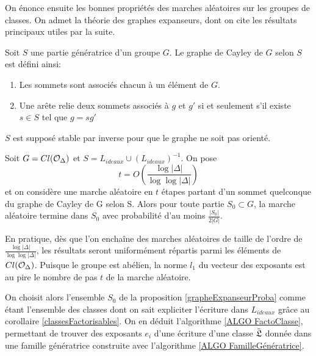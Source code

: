 On énonce ensuite les bonnes propriétés des marches aléatoires sur les groupes de classes. On admet la théorie des graphes expanseurs, dont on cite les résultats principaux utiles par la suite.

\begin{Def}
	Soit $S$ une partie génératrice d'un groupe $G$. Le graphe de Cayley de $G$ selon $S$ est défini ainsi:
	\begin{enumerate}
		\item Les sommets sont associés chacun à un élément de $G$.
		\item Une arête relie deux sommets associés à $g$ et $g'$ si et seulement s'il existe $s\in S$ tel que $g = sg'$
	\end{enumerate}
	$S$ est supposé stable par inverse pour que le graphe ne soit pas orienté.
\end{Def}

\begin{Prop}\label{grapheExpanseurProba}
	
	Soit $G = Cl(\mathcal{O}_{\Delta})$ et $S = L_{ideaux}\cup (L_{ideaux})^{-1}$. On pose
	\begin{equation*}
		t = O\left( \frac{\log|\Delta|}{\log\log|\Delta|}\right) 
	\end{equation*} 
	et on considère une marche aléatoire en $t$ étapes partant d'un sommet quelconque du graphe de Cayley de G selon S. Alors pour toute partie $S_{0}\subset G$, la marche aléatoire termine dans $S_{0}$ avec probabilité d'au moins $\frac{|S_{0}|}{2|G|}$. 
\end{Prop}

\begin{Rem}
	En pratique, dès que l'on enchaîne des marches aléatoires de taille de l'ordre de $\frac{\log|\Delta|}{\log\log|\Delta|}$, les résultats seront uniformément répartis parmi les éléments de $Cl(\mathcal{O}_{\Delta})$. Puisque le groupe est abélien, la norme $l_{1}$ du vecteur des exposants est au pire le nombre de pas $t$ de la marche aléatoire. 
\end{Rem}

On choisit alors l'ensemble $S_{0}$ de la proposition \ref{grapheExpanseurProba} comme étant l'ensemble des classes dont on sait expliciter l'écriture dans $L_{ideaux}$ grâce au corollaire \ref{classesFactorisables}. On en déduit l'algorithme \ref{ALGO FactoClasse}, permettant de trouver des exposants $e_{i}$ d'une écriture d'une classe $\tilde{\mathfrak{L}}$ donnée dans une famille génératrice construite avec l'algorithme \ref{ALGO FamilleGénératrice}.  

